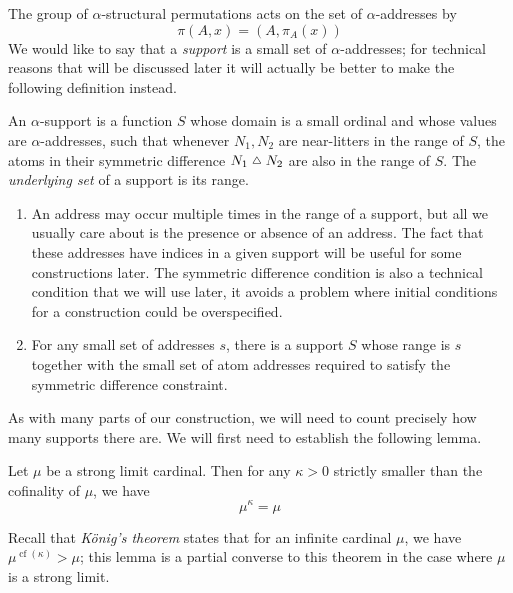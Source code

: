 The group of \( \alpha \)-structural permutations acts on the set of \( \alpha \)-addresses by
\[ \pi(A, x) = (A, \pi_A(x)) \]
We would like to say that a \emph{support} is a small set of \( \alpha \)-addresses; for technical reasons that will be discussed later it will actually be better to make the following definition instead.
\begin{definition}
    An \( \alpha \)-support is a function \( S \) whose domain is a small ordinal and whose values are \( \alpha \)-addresses, such that whenever \( N_1, N_2 \) are near-litters in the range of \( S \), the atoms in their symmetric difference \( N_1 \symmdiff N_2 \) are also in the range of \( S \).
    The \emph{underlying set} of a support is its range.
\end{definition}
\begin{remarks}
    \begin{enumerate}
        \item An address may occur multiple times in the range of a support, but all we usually care about is the presence or absence of an address.
        The fact that these addresses have indices in a given support will be useful for some constructions later.
        The symmetric difference condition is also a technical condition that we will use later, it avoids a problem where initial conditions for a construction could be overspecified.
        \item For any small set of addresses \( s \), there is a support \( S \) whose range is \( s \) together with the small set of atom addresses required to satisfy the symmetric difference constraint.
    \end{enumerate}
\end{remarks}
As with many parts of our construction, we will need to count precisely how many supports there are.
We will first need to establish the following lemma.
\begin{lemma}
    \label{lem:konig_converse}
    Let \( \mu \) be a strong limit cardinal.
    Then for any \( \kappa > 0 \) strictly smaller than the cofinality of \( \mu \), we have
    \[ \mu^\kappa = \mu \]
\end{lemma}
Recall that \emph{König's theorem} states that for an infinite cardinal \( \mu \), we have \( \mu^{\operatorname{cf}(\kappa)} > \mu \); this lemma is a partial converse to this theorem in the case where \( \mu \) is a strong limit.
